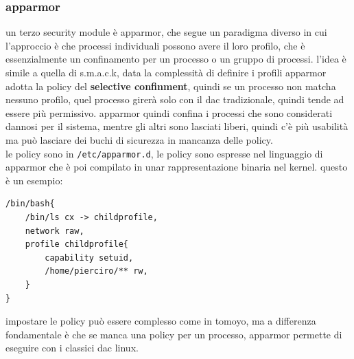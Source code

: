 \documentclass[12pt, oneside]{extbook} %
\begin{document}
\subsubsection{apparmor}
un terzo security module è apparmor, che segue un paradigma diverso in cui l'approccio è che processi individuali possono avere il loro profilo, che è essenzialmente un confinamento per un processo o un gruppo di processi. l'idea è simile a quella di s.m.a.c.k, data la complessità di definire i profili apparmor adotta la policy del \textbf{selective confinment}, quindi se un processo non matcha nessuno profilo, quel processo girerà solo con il dac tradizionale, quindi tende ad essere più permissivo. apparmor quindi confina i processi che sono considerati dannosi per il sistema, mentre gli altri sono lasciati liberi, quindi c'è più usabilità ma può lasciare dei buchi di sicurezza in mancanza delle policy.\\le policy sono in \texttt{/etc/apparmor.d}, le policy sono espresse nel linguaggio di apparmor che è poi compilato in unar rappresentazione binaria nel kernel. questo è un esempio:
\begin{lstlisting}
/bin/bash{
	/bin/ls cx -> childprofile,
	network raw,
	profile childprofile{
		capability setuid,
		/home/pierciro/** rw,	
	}
}
\end{lstlisting}
impostare le policy può essere complesso come in tomoyo, ma a differenza fondamentale è che se manca una policy per un processo, apparmor permette di eseguire con i classici dac linux.
\end{document}
